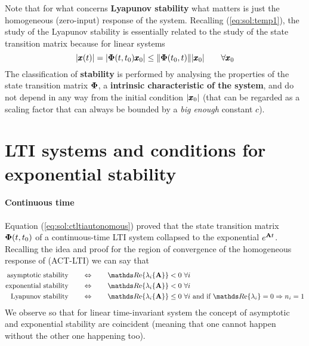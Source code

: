 	Note that for what concerns \textbf{Lyapunov stability} what matters is just the homogeneous (zero-input) response of the system. Recalling (\ref{eq:sol:temp1}), the study of the Lyapunov stability is essentially related to the study of the state transition matrix because for linear systems
	\[ |\pmb{x}(t)| = |\mathbf{\Phi}(t,t_0) \pmb{x}_0| \leq \|\mathbf{\Phi}(t_0,t)\| |\pmb{x}_0| \qquad \forall \pmb{x}_0 \]
	The classification of \textbf{stability} is performed by analysing the properties of the state transition matrix $\mathbf{\Phi}$, a \textbf{intrinsic characteristic of the system}, and do not depend in any way from the initial condition $|\pmb{x}_0|$ (that can be regarded as a scaling factor that can always be bounded by a \textit{big enough} constant $c$).
	
\section{LTI systems and conditions for exponential stability}
	\paragraph{Continuous time} Equation (\ref{eq:sol:ctltiautonomous}) proved that the state transition matrix $\mathbf{\Phi}(t,t_0)$ of a continuous-time LTI system collapsed to the exponential $e^{\mathbf{A} t}$. Recalling the idea and proof for the region of convergence of the homogeneous response of (ACT-LTI) we can say that
	\begin{equation}\begin{split}
		\textrm{asymptotic stability} \qquad & \Leftrightarrow \qquad \Re{\lambda_i\{\A\}} < 0 \ \forall i \\
		\textrm{exponential stability} \qquad & \Leftrightarrow \qquad \Re{\lambda_i\{\A\}} < 0 \ \forall i \\
		\textrm{Lyapunov stability} \qquad & \Leftrightarrow \qquad \Re{\lambda_i\{\A\}} \leq 0 \ \forall i \textrm{ and if } \Re{\lambda_i} = 0 \Rightarrow n_i = 1
	\end{split}\end{equation}
	We observe so that for linear time-invariant system the concept of asymptotic and exponential stability are coincident (meaning that one cannot happen without the other one happening too).
	
